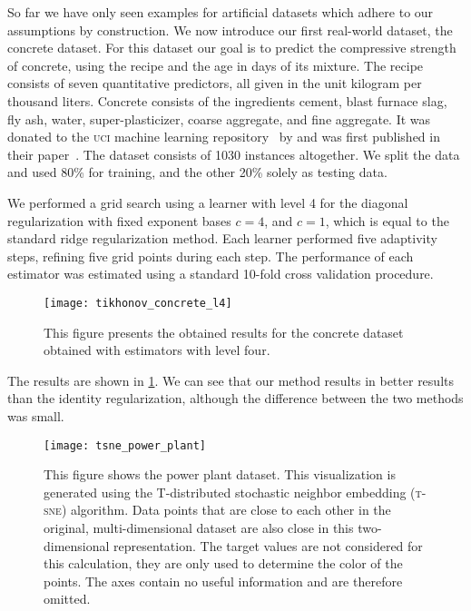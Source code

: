 So far we have only seen examples for artificial datasets which adhere to our assumptions by construction.
We now introduce our first real-world dataset, the concrete dataset.
For this dataset our goal is to predict the compressive strength of concrete,
using the recipe and the age in days of its mixture.
The recipe consists of seven quantitative predictors, all given in the unit
kilogram per thousand liters.
Concrete consists of the ingredients cement, blast furnace slag, fly ash,
water, super-plasticizer, coarse aggregate, and fine aggregate.
It was donated to the \textsc{uci} machine learning
repository~\cite{datasets-uci} by \citeauthor{datasets-concrete} and was first
published in their paper~\cite{datasets-concrete}.
The dataset consists of 1030 instances altogether.
We split the data and used 80\% for training, and the other 20\% solely as
testing data.

We performed a grid search using a learner with level 4 for the diagonal
regularization with fixed exponent bases \(c = 4\), and \(c = 1\), which is equal
to the standard ridge regularization method.
Each learner performed five adaptivity steps, refining five grid points during
each step.
The performance of each estimator was estimated using a standard 10-fold cross
validation procedure.

\begin{figure}[htb]
  \centering
  \texttt{[image: tikhonov\_concrete\_l4]}
  \caption{This figure presents the obtained results for the concrete dataset
    obtained with estimators with level four.}
  \label{fig:tikhonov-concrete-l4}
\end{figure}

The results are shown in \cref{fig:tikhonov-concrete-l4}.
We can see that our method results in better results than the identity
regularization, although the difference between the two methods was small.
\FloatBarrier{}
\begin{figure}[htb]
  \centering
  \texttt{[image: tsne\_power\_plant]}
  \caption[\textsc{t-sne} plot for the power plant dataset]{
This figure shows the power plant dataset. This visualization is generated using the T-distributed stochastic neighbor embedding (\textsc{t-sne}) algorithm. Data points that are close to each other in the
  original, multi-dimensional dataset are also close in this two-dimensional
  representation. The target values are not considered for this calculation, they
are only used to determine the color of the points. The axes contain no useful
information and are therefore omitted.
}
  \label{fig:tsne-power-plant}
\end{figure}

